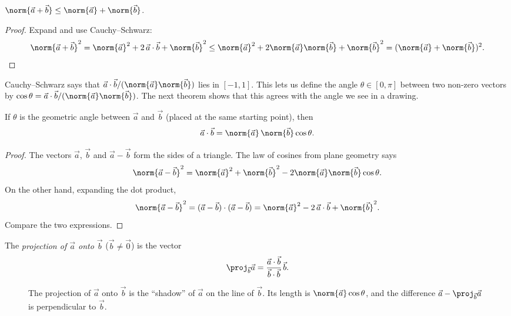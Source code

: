 \begin{corollary}
$\norm{\vec a+\vec b}\le\norm{\vec a}+\norm{\vec b}$.
\end{corollary}

\begin{proof}
Expand and use Cauchy--Schwarz:
\[
\norm{\vec a+\vec b}^2=\norm{\vec a}^2+2\,\vec a\cdot\vec b+\norm{\vec b}^2\le\norm{\vec a}^2+2\norm{\vec a}\norm{\vec b}+\norm{\vec b}^2=(\norm{\vec a}+\norm{\vec b})^2.
\]
\end{proof}

Cauchy--Schwarz says that $\vec a\cdot\vec b/(\norm{\vec a}\norm{\vec b})$ lies in $[-1,1]$. This lets us define the angle $\theta\in[0,\pi]$ between two non-zero vectors by $\cos\theta=\vec a\cdot\vec b/(\norm{\vec a}\norm{\vec b})$. The next theorem shows that this agrees with the angle we see in a drawing.

\begin{theorem}\label{thm:dotgeom}
If $\theta$ is the geometric angle between $\vec a$ and $\vec b$ (placed at the same starting point), then
\[
\vec a\cdot\vec b=\norm{\vec a}\,\norm{\vec b}\cos\theta .
\]
\end{theorem}

\begin{proof}
The vectors $\vec a$, $\vec b$ and $\vec a-\vec b$ form the sides of a triangle. The law of cosines from plane geometry says
\[
\norm{\vec a-\vec b}^2=\norm{\vec a}^2+\norm{\vec b}^2-2\norm{\vec a}\norm{\vec b}\cos\theta .
\]
On the other hand, expanding the dot product,
\[
\norm{\vec a-\vec b}^2=(\vec a-\vec b)\cdot(\vec a-\vec b)=\norm{\vec a}^2-2\,\vec a\cdot\vec b+\norm{\vec b}^2 .
\]
Compare the two expressions.
\end{proof}

\begin{definition}[Projection]
The \emph{projection of $\vec a$ onto $\vec b$} ($\vec b\neq\vec 0$) is the vector
\[
\proj_{\vec b}\vec a=\frac{\vec a\cdot\vec b}{\vec b\cdot\vec b}\,\vec b .
\]
\end{definition}

\begin{figure}[ht]
\centering
{}
\caption{The projection of $\vec a$ onto $\vec b$ is the ``shadow'' of $\vec a$ on the line of $\vec b$. Its length is $\norm{\vec a}\cos\theta$, and the difference $\vec a-\proj_{\vec b}\vec a$ is perpendicular to $\vec b$.}
\label{fig:proj}
\end{figure}

